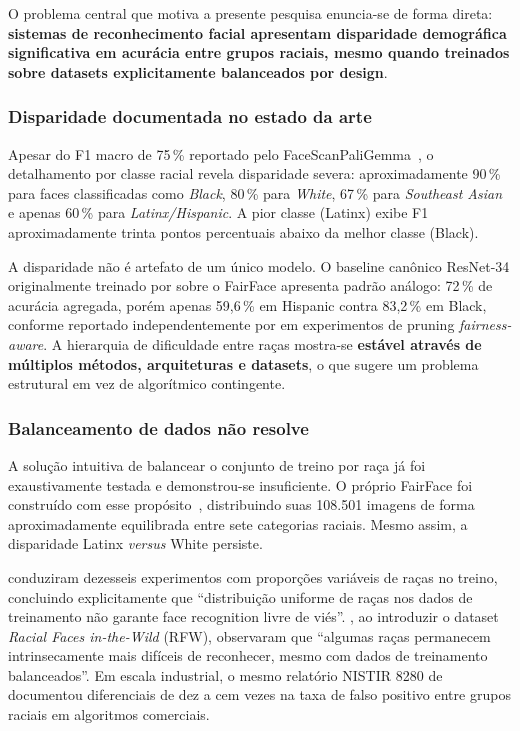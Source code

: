 O problema central que motiva a presente pesquisa enuncia-se de forma direta: \textbf{sistemas de reconhecimento facial apresentam disparidade demográfica significativa em acurácia entre grupos raciais, mesmo quando treinados sobre datasets explicitamente balanceados por design}.

\subsubsection{Disparidade documentada no estado da arte}
\label{sec:problema_disparidade}

Apesar do F1 macro de 75\,\% reportado pelo FaceScanPaliGemma~\autocite{aldahoul2024exploring}, o detalhamento por classe racial revela disparidade severa: aproximadamente 90\,\% para faces classificadas como \emph{Black}, 80\,\% para \emph{White}, 67\,\% para \emph{Southeast Asian} e apenas 60\,\% para \emph{Latinx/Hispanic}. A pior classe (Latinx) exibe F1 aproximadamente trinta pontos percentuais abaixo da melhor classe (Black).

A disparidade não é artefato de um único modelo. O baseline canônico ResNet-34 originalmente treinado por \textcite{karkkainen2021fairface} sobre o FairFace apresenta padrão análogo: 72\,\% de acurácia agregada, porém apenas 59,6\,\% em Hispanic contra 83,2\,\% em Black, conforme reportado independentemente por \textcite{lin2022fairgrape} em experimentos de pruning \emph{fairness-aware}. A hierarquia de dificuldade entre raças mostra-se \textbf{estável através de múltiplos métodos, arquiteturas e datasets}, o que sugere um problema estrutural em vez de algorítmico contingente.

\subsubsection{Balanceamento de dados não resolve}
\label{sec:problema_balanceamento}

A solução intuitiva de balancear o conjunto de treino por raça já foi exaustivamente testada e demonstrou-se insuficiente. O próprio FairFace foi construído com esse propósito~\autocite{karkkainen2021fairface}, distribuindo suas 108.501 imagens de forma aproximadamente equilibrada entre sete categorias raciais. Mesmo assim, a disparidade Latinx \emph{versus} White persiste.

\textcite{kolla2022impact} conduziram dezesseis experimentos com proporções variáveis de raças no treino, concluindo explicitamente que ``distribuição uniforme de raças nos dados de treinamento não garante face recognition livre de viés''. \textcite{wang2019racial}, ao introduzir o dataset \emph{Racial Faces in-the-Wild} (RFW), observaram que ``algumas raças permanecem intrinsecamente mais difíceis de reconhecer, mesmo com dados de treinamento balanceados''. Em escala industrial, o mesmo relatório NISTIR 8280 de \textcite{grother2019face} documentou diferenciais de dez a cem vezes na taxa de falso positivo entre grupos raciais em algoritmos comerciais.

